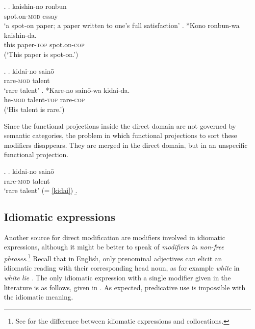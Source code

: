 \documentclass [output=book,colorlinks,citecolor=brown]{langscibook}
\begin{document}
\ex. \ag. kaishin-no ronbun\\
spot.on-\textsc{mod} essay\\
`a spot-on paper; a paper written to one's full satisfaction'
\bg. *Kono ronbun-wa kaishin-da.\\
this paper-\textsc{top} spot.on-\textsc{cop}\\
(`This paper is spot-on.’)

\ex. \ag. kidai-no sainō\\
rare-\textsc{mod} talent\\
`rare talent’ \label{kidai}
\bg. *Kare-no sainō-wa kidai-da.\\
he-\textsc{mod} talent-\textsc{top} rare-\textsc{cop}\\
(`His talent is rare.’)

Since the functional projections inside the direct domain are not governed by semantic categories, the problem in which functional projections to sort these modifiers disappears. They are merged in the direct domain, but in an unspecific functional projection.


\ex. \ag. kidai-no sainō\\
rare-\textsc{mod} talent\\
`rare talent’ (= \ref{kidai})
\b. 

\subsection{Idiomatic expressions} \label{idiomatic}

Another source for direct modification are modifiers involved in idiomatic expressions, although it might be better to speak of \textit{modifiers in non-free phrases}.\footnote{See \citet{melcuk:2012:phraseology, kohlich:2024:nonfree} for the difference between idiomatic expressions and collocations.} Recall that in English, only prenominal adjectives can elicit an idiomatic reading with their corresponding head noun, as for example \textit{white} in \textit{white lie} \citep[87–88]{cinque:2010:adj}. The only idiomatic expression with a single modifier given in the literature is as follows, given in \citet[122]{nagano:2015:RA}. As expected, predicative use is impossible with the idiomatic meaning. %
\end{document}

